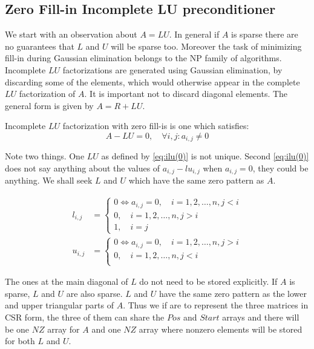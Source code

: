 \subsection{Zero Fill-in Incomplete LU preconditioner}
We start with an observation about $A=LU$. In general if $A$ is sparse there are no guarantees that $L$ and $U$ will be sparse too. Moreover the task of minimizing fill-in during Gaussian elimination belongs to the NP family of algorithms. Incomplete $LU$ factorizations are generated using Gaussian elimination, by discarding some of the elements, which would otherwise appear in the complete $LU$ factorization of $A$. It is important not to discard diagonal elements. The general form is given by $A = R + LU$.

Incomplete $LU$ factorization with zero fill-is is one which satisfies:
\begin{equation}\label{eq:ilu(0)}
	A - LU = 0, \quad \forall{i, j} : a_{i,j} \neq 0
\end{equation}

Note two things. One $LU$ as defined by \cref{eq:ilu(0)} is not unique. Second \cref{eq:ilu(0)} does not say anything about the values of $a_{i,j} - lu_{i, j}$ when $a_{i,j} = 0$, they could be anything. We shall seek $L$ and $U$ which have the same zero pattern as $A$.

\begin{align}
	l_{i,j} &= \begin{cases}
		 0 \iff a_{i,j} = 0, \quad i = 1, 2, \dots, n, j < i \\
		 0, \quad i = 1, 2, \dots, n, j > i \\
		 1, \quad i = j
	\end{cases} \\
	u_{i,j} &= \begin{cases}
		 0 \iff a_{i,j} = 0, \quad i = 1, 2, \dots, n, j > i \\
		 0, \quad i = 1, 2, \dots, n, j < i \\
	\end{cases}
\end{align}

The ones at the main diagonal of $L$ do not need to be stored explicitly. If $A$ is sparse, $L$ and $U$ are also sparse. $L$ and $U$ have the same zero pattern as the lower and upper triangular parts of $A$. Thus we if are to represent the three matrices in CSR form, the three of them can share the $Pos$ and $Start$ arrays and there will be one $NZ$ array for $A$ and one $NZ$ array where nonzero elements will be stored for both $L$ and $U$.
